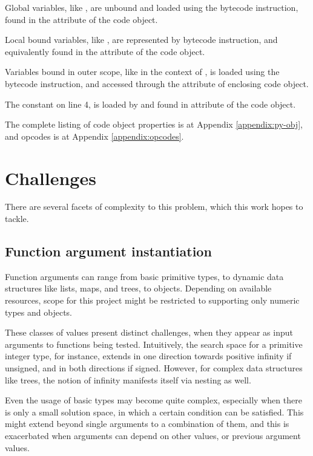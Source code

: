 \documentclass{icldt}
\numberwithin{equation}{section}       %
\begin{document}
{Global variables, like , are unbound and loaded using the  bytecode instruction, found in the  attribute of the code object.

Local bound variables, like , are represented by  bytecode instruction, and equivalently found in the  attribute of the code object.

Variables bound in outer scope, like  in the context of , is loaded using the  bytecode instruction, and accessed through the  attribute of enclosing code object.

The constant  on line 4, is loaded by  and found in  attribute of the code object.

The complete listing of code object properties is at Appendix \ref{appendix:py-obj}, and opcodes is at Appendix \ref{appendix:opcodes}.

\section{Challenges}
\label{sect:challenges}
There are several facets of complexity to this problem, which this work hopes to tackle.

\subsection{Function argument instantiation}
Function arguments can range from basic primitive types, to dynamic data structures like lists, maps, and trees, to objects. Depending on available resources, scope for this project might be restricted to supporting only numeric types and objects.

These classes of values present distinct challenges, when they appear as input arguments to functions being tested. Intuitively, the search space for a primitive integer type, for instance, extends in one direction towards positive infinity if unsigned, and in both directions if signed. However, for complex data structures like trees, the notion of infinity manifests itself via nesting as well.

Even the usage of basic types may become quite complex, especially when there is only a small solution space, in which a certain condition can be satisfied. This might extend beyond single arguments to a combination of them, and this is exacerbated when arguments can depend on other values, or previous argument values.

}
\end{document}
